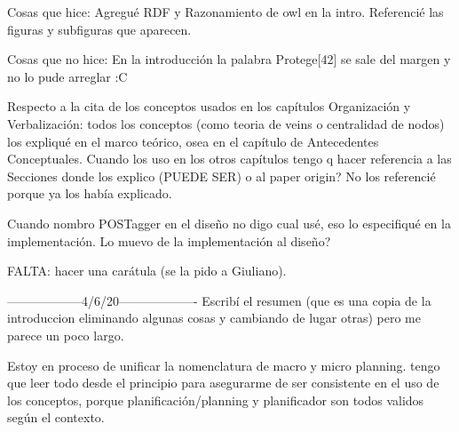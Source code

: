 Cosas que hice:
Agregué RDF y Razonamiento de owl en la intro.
Referencié las figuras y subfiguras que aparecen.

Cosas que no hice:
En la introducción la palabra Protege[42] se sale del margen y no lo pude arreglar :C

Respecto a la cita de los conceptos usados en los capítulos Organización y Verbalización: todos los conceptos 
(como teoria de veins o centralidad de nodos) los expliqué en el marco teórico, osea en el capítulo de Antecedentes Conceptuales. Cuando los uso en los otros capítulos tengo q hacer referencia a las Secciones donde los explico (PUEDE SER) o al paper origin? No los referencié porque ya los había explicado.

Cuando nombro POSTagger en el diseño no digo cual usé, eso lo especifiqué en la implementación. Lo muevo de la implementación al diseño?


FALTA: hacer una carátula (se la pido a Giuliano).

------------------4/6/20-------------------
Escribí el resumen (que es una copia de la introduccion eliminando algunas cosas y cambiando de lugar otras) pero me parece un poco largo.


Estoy en proceso de unificar la nomenclatura de macro y micro planning. tengo que leer todo desde el principio para asegurarme de ser consistente en el uso de los conceptos, porque planificación/planning y planificador son todos validos según el contexto.

